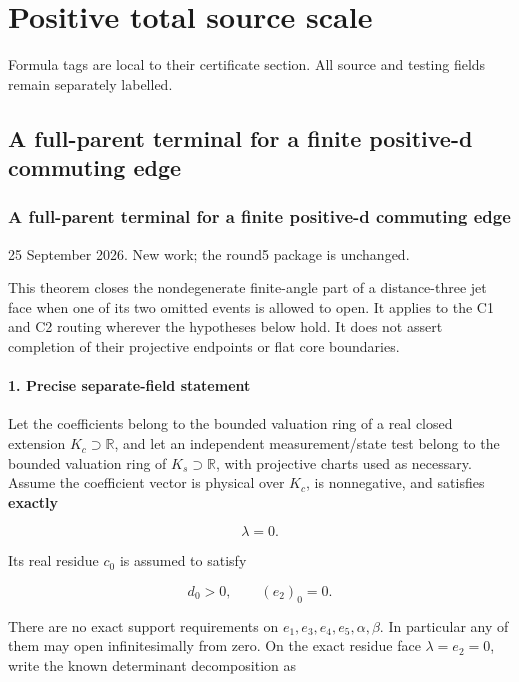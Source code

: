 \chapter{Positive total source scale}
\label{ch:cert-2}
Formula tags are local to their certificate section. All source and testing fields remain separately labelled.

\section{\texorpdfstring{A full-parent terminal for a finite positive-d commuting edge}{A full-parent terminal for a finite positive-d commuting edge}}
\label{component:p4ec1a51262f9}
\hypertarget{a-full-parent-terminal-for-a-finite-positive-d-commuting-edge}{%
\subsection*{A full-parent terminal for a finite positive-d commuting edge}\label{p4ec1a51262f9:a-full-parent-terminal-for-a-finite-positive-d-commuting-edge}}

25 September 2026. New work; the round5 package is unchanged.

This theorem closes the nondegenerate finite-angle part of a distance-three
jet face when one of its two omitted events is allowed to open. It applies
to the C1 and C2 routing wherever the hypotheses below hold. It does not
assert completion of their projective endpoints or flat core boundaries.

\hypertarget{precise-separate-field-statement}{%
\subsubsection*{1. Precise separate-field statement}\label{p4ec1a51262f9:precise-separate-field-statement}}

Let the coefficients belong to the bounded valuation ring of a real closed
extension \(K_c\supset\mathbb R\), and let an independent measurement/state
test belong to the bounded valuation ring of \(K_s\supset\mathbb R\), with
projective charts used as necessary. Assume the coefficient vector is
physical over \(K_c\), is nonnegative, and satisfies \textbf{exactly}

\[
\lambda=0.
\]

Its real residue \(c_0\) is assumed to satisfy

\[
d_0>0,\qquad (e_2)_0=0.
\tag{1}
\]

There are no exact support requirements on \(e_1,e_3,e_4,e_5,\alpha,\beta\).
In particular any of them may open infinitesimally from zero. On the exact
residue face \(\lambda=e_2=0\), write the known determinant decomposition as

